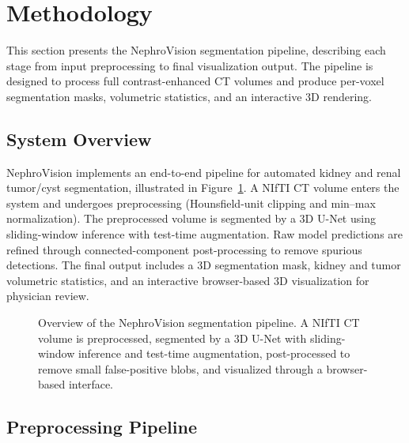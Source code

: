 \section{Methodology}

This section presents the NephroVision segmentation pipeline, describing each stage from input preprocessing to final visualization output. The pipeline is designed to process full contrast-enhanced CT volumes and produce per-voxel segmentation masks, volumetric statistics, and an interactive 3D rendering.

\subsection{System Overview}

NephroVision implements an end-to-end pipeline for automated kidney and renal tumor/cyst segmentation, illustrated in Figure~\ref{fig:pipeline}. A NIfTI CT volume enters the system and undergoes preprocessing (Hounsfield-unit clipping and min--max normalization). The preprocessed volume is segmented by a 3D U-Net \cite{unet3d} using sliding-window inference with test-time augmentation. Raw model predictions are refined through connected-component post-processing to remove spurious detections. The final output includes a 3D segmentation mask, kidney and tumor volumetric statistics, and an interactive browser-based 3D visualization for physician review.

\begin{figure}[!t]
\centering
\caption{Overview of the NephroVision segmentation pipeline. A NIfTI CT volume is preprocessed, segmented by a 3D U-Net with sliding-window inference and test-time augmentation, post-processed to remove small false-positive blobs, and visualized through a browser-based interface.}
\label{fig:pipeline}
\end{figure}

\subsection{Preprocessing Pipeline}


